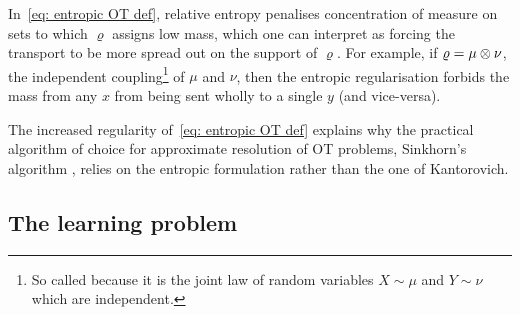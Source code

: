 In~\eqref{eq: entropic OT def}, relative entropy penalises concentration of measure on sets to which $\varrho$ assigns low mass, which one can interpret as forcing the transport to be more spread out on the support of $\varrho$. For example, if $\varrho=\mu\otimes\nu$, the independent coupling\footnote{So called because it is the joint law of random variables $X\sim\mu$ and $Y\sim\nu$ which are independent.} of $\mu$ and $\nu$, then the entropic regularisation forbids the mass from any $x$ from being sent wholly to a single $y$ (and vice-versa). 

The increased regularity of~\eqref{eq: entropic OT def} explains why the practical algorithm of choice for approximate resolution of OT problems, Sinkhorn's algorithm \citep{sinkhorn_concerning_1967,cuturi_sinkhorn_2013,peyre_computational_2020}, relies on the entropic formulation rather than the one of Kantorovich. 


\subsection{The learning problem}




